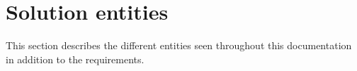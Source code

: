 \section{Solution entities} \label{sec:solution entities}
This section describes the different entities seen throughout this documentation in addition to the requirements.
